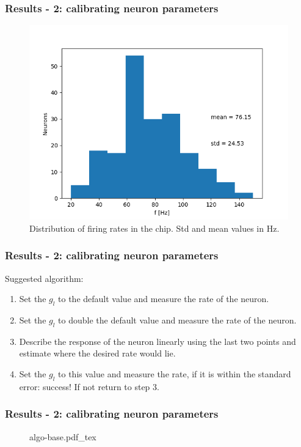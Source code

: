 \documentclass{beamer}
\newcommand{\incfig}[1]{
    \def\svgwidth{\columnwidth}
    {#1.pdf_tex}
}
\begin{document}
\begin{frame}
    \frametitle{Results - 2: calibrating neuron parameters}
    \begin{figure}
        \centering
        \includegraphics[width=.8\textwidth]{figures/rate-distribution.png}
        \caption{Distribution of firing rates in the chip. Std and mean values
        in Hz.}
    \end{figure}
\end{frame}

\begin{frame}
    \frametitle{Results - 2: calibrating neuron parameters}
    Suggested algorithm:
    \begin{enumerate}
        \item Set the $g_l$ to the default value and measure the rate of the neuron.
        \item Set the $g_l$ to double the default value and measure the rate of the
            neuron.
        \item Describe the response of the neuron linearly using the last two
            points and estimate where the desired rate would lie.
        \item Set the $g_l$ to this value and measure the rate, if it is within the
        standard error: success! If not return to step 3.
    \end{enumerate}
\end{frame}

\begin{frame}
    \frametitle{Results - 2: calibrating neuron parameters}
    \begin{figure}
        \incfig{algo-base}
    \end{figure}
\end{frame}
\end{document}
